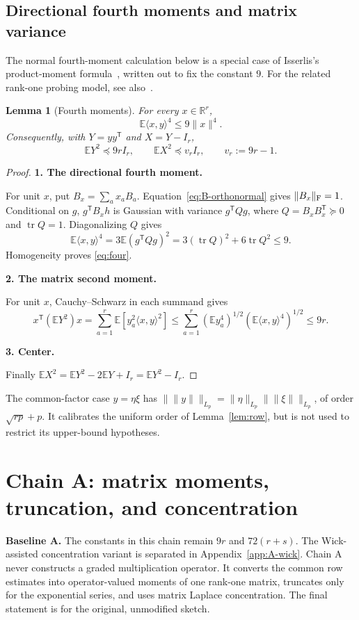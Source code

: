 \documentclass[11pt]{article}
\numberwithin{equation}{section}
\newtheorem{lemma}[theorem]{Lemma}
\theoremstyle{definition}\newtheorem{definition}[theorem]{Definition}
\theoremstyle{remark}\newtheorem{remark}[theorem]{Remark}
\newcommand{\R}{\mathbb R}\newcommand{\E}{\mathbb E}\newcommand{\Prob}{\mathbb P}
\newcommand{\tr}{\operatorname{tr}}\newcommand{\Ent}{\operatorname{Ent}}
\newcommand{\norm}[1]{\lVert#1\rVert}\newcommand{\ip}[2]{\langle#1,#2\rangle}
\newcommand{\step}[1]{\par\addvspace{.65\baselineskip}\Needspace{4\baselineskip}\noindent\textbf{#1}\par\nobreak\smallskip}
\begin{document}
\subsection{Directional fourth moments and matrix variance}
The normal fourth-moment calculation below is a special case of Isserlis's
product-moment formula~\cite{Isserlis}, written out to fix the constant $9$.
For the related rank-one probing model, see also~\cite{BK}.
\begin{lemma}[Fourth moments]\label{lem:four}
For every $x\in\R^r$,
\begin{equation}\label{eq:four}
 \E\ip{x}{y}^4\le9\norm x^4.
\end{equation}
Consequently, with $Y=yy^{\mathsf T}$ and $X=Y-I_r$,
\begin{equation}\label{eq:variance}
 \E Y^2\preceq9rI_r,\qquad
 \E X^2\preceq v_r I_r,\qquad v_r:=9r-1.
\end{equation}
\end{lemma}
\begin{proof}
\step{1. The directional fourth moment.}
For unit $x$, put $B_x=\sum_a x_aB_a$. Equation~\eqref{eq:B-orthonormal} gives
$\norm{B_x}_\F=1$. Conditional on $g$, $g^{\mathsf T}B_xh$ is Gaussian with
variance $g^{\mathsf T}Qg$, where $Q=B_xB_x^{\mathsf T}\succeq0$ and $\tr Q=1$.
Diagonalizing $Q$ gives
\[
 \E\ip{x}{y}^4=3\E(g^{\mathsf T}Qg)^2
 =3(\tr Q)^2+6\tr Q^2\le9.
\]
Homogeneity proves \eqref{eq:four}.

\step{2. The matrix second moment.}
For unit $x$, Cauchy--Schwarz in each summand gives
\[
 x^{\mathsf T}(\E Y^2)x
 =\sum_{a=1}^r\E[y_a^2\ip{x}{y}^2]
 \le\sum_{a=1}^r(\E y_a^4)^{1/2}(\E\ip{x}{y}^4)^{1/2}
 \le9r.
\]

\step{3. Center.}
Finally $\E X^2=\E Y^2-2\E Y+I_r=\E Y^2-I_r$.
\end{proof}
The common-factor case $y=\eta\xi$ has
$\|\norm y\|_{L_p}=\|\eta\|_{L_p}\|\norm\xi\|_{L_p}$, of order
$\sqrt{rp}+p$. It calibrates the uniform order of Lemma~\ref{lem:row}, but is not
used to restrict its upper-bound hypotheses.

\clearpage
\section{Chain A: matrix moments, truncation, and concentration}\label{sec:A}
\begin{takeaway}
\textbf{Baseline A.} The constants in this chain remain $9r$ and $72(r+s)$.
The Wick-assisted concentration variant is separated in Appendix~\ref{app:A-wick}.
Chain A never constructs a graded multiplication operator. It converts the common
row estimates into operator-valued moments of one rank-one matrix, truncates only
for the exponential series, and uses matrix Laplace concentration. The final
statement is for the original, unmodified sketch.
\end{takeaway}
\end{document}
